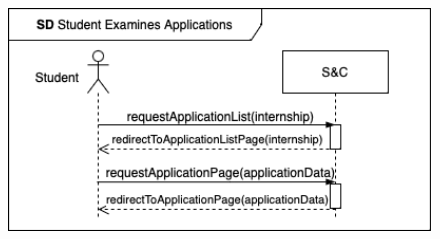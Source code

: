 \begin{enumerate}[label=\textbf{[US\arabic*]}, left = 0pt, align = left, resume]
            \newpage
            \begin{figure}[h!]
                \centering  \includegraphics[width=1\textwidth]{RASD/Images/UseCases/US07_StudentExaminesApplications.drawio.png}
                \label{fig:example}
            \end{figure}
        \end{enumerate}

    \newpage
